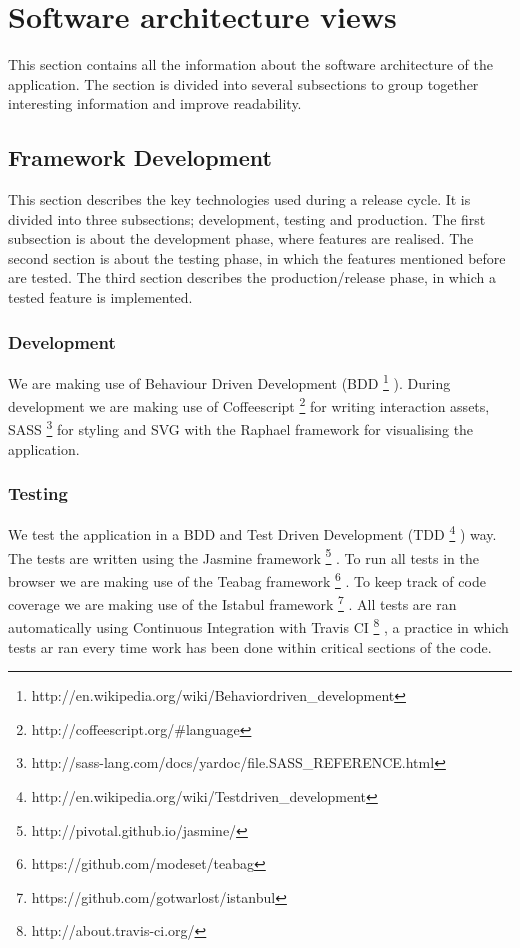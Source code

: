 \documentclass{report}
\begin{document}
			
	\clearpage
	\section{Software architecture views}
		This section contains all the information about the software architecture of the application. The section is divided into several subsections to group together interesting information and improve readability.	
		
		\subsection{Framework Development}
			This section describes the key technologies used during a release cycle.
			It is divided into three subsections; development, testing and production.
			The first subsection is about the development phase, where features are realised.
			The second section is about the testing phase, in which the features mentioned before are tested.
			The third section describes the production/release phase, in which a tested feature is implemented.
			
			\subsubsection{Development}
				We are making use of Behaviour Driven Development (BDD \footnote{http://en.wikipedia.org/wiki/Behavior\-driven\_development} ). 
				During development we are making use of Coffeescript \footnote{http://coffeescript.org/\#language} for writing interaction assets, SASS \footnote{http://sass-lang.com/docs/yardoc/file.SASS\_REFERENCE.html} for styling and SVG with the Raphael framework for visualising the application.
			\subsubsection{Testing}
				We test the application in a BDD and Test Driven Development (TDD \footnote{http://en.wikipedia.org/wiki/Test\-driven\_development} ) way. 
				The tests are written using the Jasmine framework \footnote{http://pivotal.github.io/jasmine/} . To run all tests in the browser we are making use of the Teabag framework \footnote{https://github.com/modeset/teabag} . To keep track of code coverage we are making use of the Istabul framework \footnote{https://github.com/gotwarlost/istanbul} . All tests are ran automatically using Continuous Integration with Travis CI \footnote{http://about.travis-ci.org/} , a practice in which tests ar ran every time work has been done within critical sections of the code. 
\end{document}
